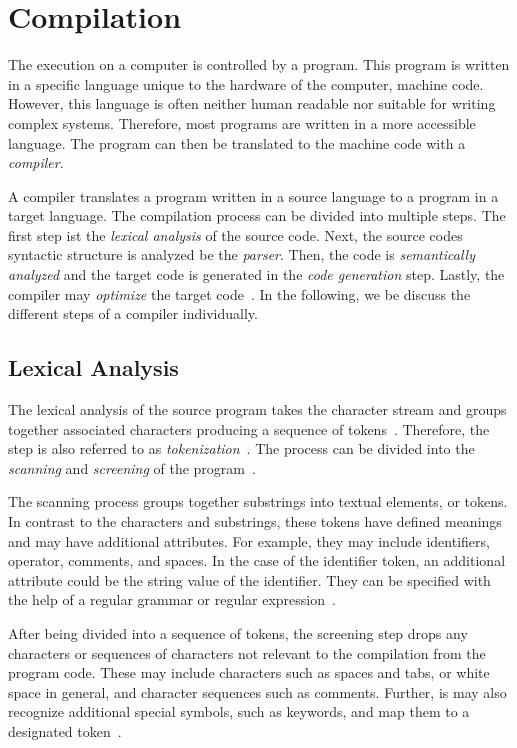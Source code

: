 \section{Compilation}
The execution on a computer is controlled by a program. This program is written in a specific language unique to the hardware of the computer, machine code. However, this language is often neither human readable nor suitable for writing complex systems. Therefore, most programs are written in a more accessible language. The program can then be translated to the machine code with a \emph{compiler}. 

A compiler translates a program written in a source language to a program in a target language. The compilation process can be divided into multiple steps. The first step ist the \emph{lexical analysis} of the source code. Next, the source codes syntactic structure is analyzed be the \emph{parser}. Then, the code is \emph{semantically analyzed} and the target code is generated in the \emph{code generation} step. Lastly, the compiler may \emph{optimize} the target code~\cite{Oliv07}. In the following, we be discuss the different steps of a compiler individually.

\subsection{Lexical Analysis}
The lexical analysis of the source program takes the character stream and groups together associated characters producing a sequence of tokens~\cite{Oliv07}. Therefore, the step is also referred to as \emph{tokenization}~\cite{Gref99}. The process can be divided into the \emph{scanning} and \emph{screening} of the program~\cite{DeRe74}.


The scanning process groups together substrings into textual elements, or tokens. In contrast to the characters and substrings, these tokens have defined meanings and may have additional attributes. For example, they may include identifiers, operator, comments, and spaces. In the case of the identifier token, an additional attribute could be the string value of the identifier.  They can be specified with the help of a regular grammar or regular expression~\cite{DeRe74,VSSD07}.  

After being divided into a sequence of tokens, the screening step drops any characters or sequences of characters not relevant to the compilation from the program code. 
These may include characters such as spaces and tabs, or white space in general, and character sequences such as comments. 
Further, is may also recognize additional special symbols, such as keywords, and map them to a designated token~\cite{DeRe74}.

